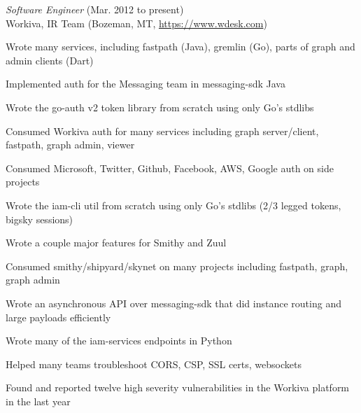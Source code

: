 \documentclass[10pt, a4paper]{article}
\begin{document}
\begin{itemize*}
  \item \emph{Software Engineer} (Mar. 2012 to present)\\
    Workiva, IR Team (Bozeman, MT, \url{https://www.wdesk.com})
    \begin{itemize*}
    \item Wrote many services, including fastpath (Java), gremlin (Go), parts of graph and admin clients (Dart)
    \item Implemented auth for the Messaging team in messaging-sdk Java
    \item Wrote the go-auth v2 token library from scratch using only Go's stdlibs
    \item Consumed Workiva auth for many services including graph server/client, fastpath, graph admin, viewer
    \item Consumed Microsoft, Twitter, Github, Facebook, AWS, Google auth on side projects
    \item Wrote the iam-cli util from scratch using only Go's stdlibs (2/3 legged tokens, bigsky sessions)
    \item Wrote a couple major features for Smithy and Zuul
    \item Consumed smithy/shipyard/skynet on many projects including fastpath, graph, graph admin
    \item Wrote an asynchronous API over messaging-sdk that did instance routing and large payloads efficiently
    \item Wrote many of the iam-services endpoints in Python
    \item Helped many teams troubleshoot CORS, CSP, SSL certs, websockets
    \item Found and reported twelve high severity vulnerabilities in the Workiva platform in the last year
      

\end{itemize*}
\end{itemize*}
\end{document}
